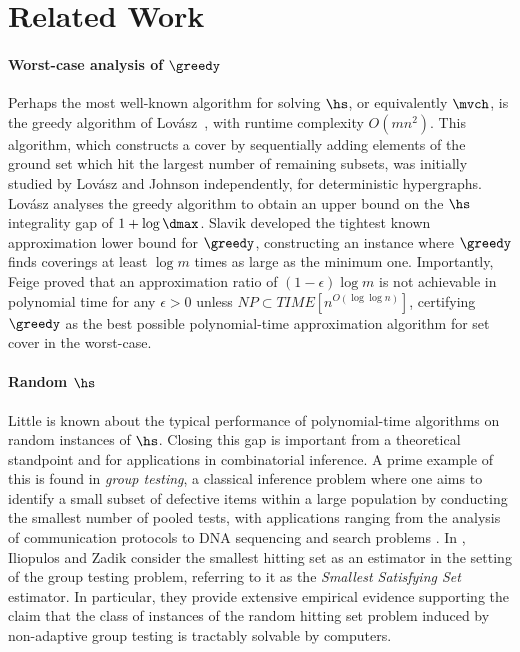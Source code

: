 \section{Related Work}\label{sec:related work}
\paragraph*{\textbf{Worst-case analysis of $\greedy$}}
Perhaps the most well-known algorithm for solving $\hs$, or equivalently $\mvch$, is the greedy algorithm of Lovász~\cite{lovasz1975ratio}, with runtime complexity $O(mn^2)$. This algorithm, which constructs a cover by sequentially adding elements of the ground set which hit the largest number of remaining subsets, was initially studied by Lovász \cite{lovasz1975ratio} and Johnson \cite{johnson1973approximation} independently, for deterministic hypergraphs. Lovász analyses the greedy algorithm to obtain an upper bound on the $\hs$ integrality gap of $1+\log \dmax$. Slavik \cite{slavik1996tight} developed the tightest known approximation lower bound for $\greedy$, constructing an instance where $\greedy$ finds coverings at least $\log{m}$ times as large as the minimum one. Importantly, Feige \cite{feige1998threshold} proved that an approximation ratio of $(1 - \epsilon) \log{m}$ is not achievable in polynomial time for any $\epsilon > 0$ unless \(\mathit{NP} \subset \mathit{TIME}[n^{O(\log \log n)}]\), certifying $\greedy$ as the best possible polynomial-time approximation algorithm for set cover in the worst-case. 
\paragraph*{\textbf{Random $\hs$}}
Little is known about the typical performance of polynomial-time algorithms on random instances of $\hs$. Closing this gap is important from a theoretical standpoint and for applications in combinatorial inference. A prime example of this is found in \emph{group testing}, a classical inference problem where one aims to identify a small subset of defective items within a large population by conducting the smallest number of pooled tests, with applications ranging from the analysis of communication protocols \cite{fernandez2013unbounded} to DNA sequencing \cite{erlich2015biological} and search problems \cite{du2000combinatorial}. In \cite{iliopoulos2021group}, Iliopulos and Zadik consider the smallest hitting set as an estimator in the setting of the group testing problem, referring to it as the \emph{Smallest Satisfying Set} estimator. In particular, they provide extensive empirical evidence supporting the claim that the class of instances of the random hitting set problem induced by non-adaptive group testing is tractably solvable by computers. 
%
